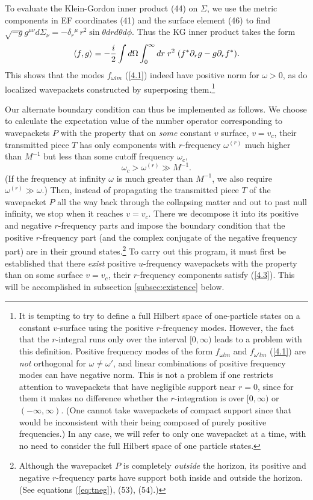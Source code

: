 \documentclass[12pt]{article}
\def\o{\omega}
\def\la{\langle}
\def\ra{\rangle}
\begin{document}
To evaluate the Klein-Gordon inner product (44) on $\Sigma$,
we use the metric components in EF
coordinates (41) and the surface element (46) to find
$\sqrt{-g}g^{\mu\nu}d\Sigma_\nu
=-\delta_r{}^\mu\, r^2 \sin\theta dr d\theta d\phi$.
Thus the KG inner product takes the form
\begin{equation}
\la f,g\ra = -{i\over2}\int d\Omega \int_0^\infty dr
\; r^2 \; (f^*\partial_r g-g\partial_rf^*).
\label{KGnorm}
\end{equation}
This shows that the modes $f_{\o lm}$ (\ref{4.1}) indeed have
positive norm for $\o>0$, as do localized wavepackets
constructed by superposing them.\footnote{It is tempting
to try to define a
full Hilbert space of one-particle states on a constant
$v$-surface using the positive $r$-frequency modes.
However, the fact that the $r$-integral runs
only over the interval $[0,\infty)$ leads to a problem with
this definition. Positive frequency modes of the form $f_{\o lm}$
and $f_{\o' lm}$ (\ref{4.1}) are {\it not} orthogonal for $\o\ne\o'$,
and linear combinations of positive frequency modes can have
negative norm. This is not a problem if one restricts
attention to wavepackets that have negligible
support near $r=0$, since for them it makes no difference whether
the $r$-integration is over $[0,\infty)$ or $(-\infty,\infty)$.
(One cannot take wavepackets of compact support since that would
be inconsistent with their being composed of purely positive
frequencies.) In any case, we will refer to only one wavepacket
at a time, with no need to consider the full Hilbert space of
one particle states.}

Our alternate boundary condition can thus be implemented as
follows. We choose to calculate the expectation value of
the number operator corresponding to wavepackets $P$
with the property that on {\it some} constant $v$ surface,
$v=v_c$, their transmitted piece $T$ has only
components with $r$-frequency $\o^{(r)}$ much higher than $M^{-1}$
but less than some cutoff frequency $\omega_c$,
\begin{equation}
\o_c>\o^{(r)}\gg M^{-1}.
\label{4.3}
\end{equation}
(If the frequency at infinity $\o$ is much greater than
$M^{-1}$, we also require $\o^{(r)}\gg\o$.)
Then, instead of propagating the transmitted
piece $T$ of the wavepacket $P$ all the way back
through the collapsing matter and out to past null infinity,
we stop when it reaches $v=v_c$.
There we decompose it into its positive and negative
$r$-frequency parts and impose the boundary condition that the
positive $r$-frequency part (and the complex conjugate of
the negative frequency part) are in their ground
states.\footnote{Although the wavepacket $P$ is completely
{\it outside} the horizon, its positive and negative
$r$-frequency parts have support both inside and outside the
horizon. (See equations (\ref{eq:tneg}), (53), (54).)}
To carry out this program, it must first be established that
there {\it exist} positive $u$-frequency wavepackets with the
property than on some surface $v=v_c$, their $r$-frequency
components satisfy (\ref{4.3}). This will be accomplished in
subsection \ref{subsec:existence} below.
\end{document}
